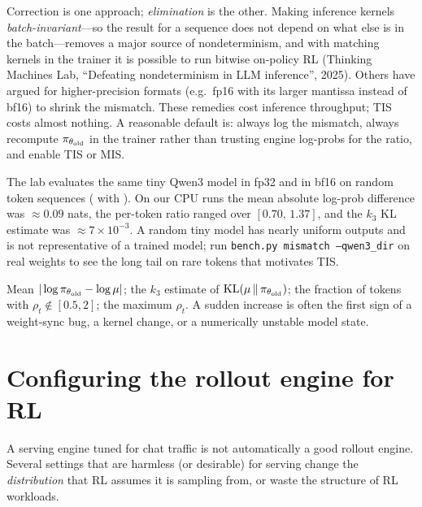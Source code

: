 Correction is one approach; \emph{elimination} is the other. Making inference kernels
\emph{batch-invariant}---so the result for a sequence does not depend on what else is in the
batch---removes a major source of nondeterminism, and with matching kernels in the trainer it
is possible to run bitwise on-policy RL (Thinking Machines Lab, ``Defeating nondeterminism in
LLM inference'', 2025). Others have argued for higher-precision formats (e.g.\ fp16 with its
larger mantissa instead of bf16) to shrink the mismatch. These remedies cost inference
throughput; TIS costs almost nothing. A reasonable default is: always log the mismatch, always
recompute $\pi_{\theta_{\text{old}}}$ in the trainer rather than trusting engine log-probs for the ratio, and
enable TIS or MIS.

\begin{napkinmath}
The lab evaluates the same tiny Qwen3 model in fp32 and in bf16 on random token sequences
( with ). On our CPU runs the mean
absolute log-prob difference was $\approx 0.09$ nats, the per-token ratio ranged over
$[0.70,\,1.37]$, and the $k_3$ KL estimate was $\approx 7\times10^{-3}$. A random tiny model
has nearly uniform outputs and is not representative of a trained model; run
\texttt{bench.py mismatch --qwen3\_dir} on real weights to see the long tail on rare
tokens that motivates TIS.
\end{napkinmath}

\begin{keyidea}
Mean $|\log\pi_{\theta_{\text{old}}}-\log\mu|$; the $k_3$ estimate of $\operatorname{KL}(\mu\,\|\,\pi_{\theta_{\text{old}}})$; the fraction of
tokens with $\rho_t\notin[0.5,2]$; the maximum $\rho_t$. A sudden increase is often the first
sign of a weight-sync bug, a kernel change, or a numerically unstable model state.
\end{keyidea}
\section{Configuring the rollout engine for RL}\label{sec:rlsys:engine}

A serving engine tuned for chat traffic is not automatically a good rollout engine. Several
settings that are harmless (or desirable) for serving change the \emph{distribution} that RL
assumes it is sampling from, or waste the structure of RL workloads.

